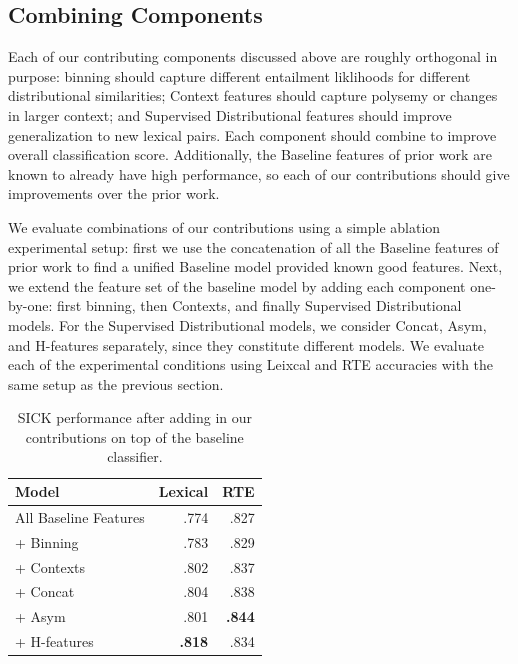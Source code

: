 \subsection{Combining Components}

Each of our contributing components discussed above are roughly orthogonal
in purpose: binning should capture different entailment liklihoods for
different distributional similarities; Context features should capture
polysemy or changes in larger context; and Supervised Distributional features
should improve generalization to new lexical pairs. Each component should
combine to improve overall classification score. Additionally, the Baseline
features of prior work are known to already have high performance, so each
of our contributions should give improvements over the prior work.

We evaluate combinations of our contributions using a simple ablation
experimental setup: first we use the concatenation of all the Baseline features
of prior work to find a unified Baseline model provided known good features.
Next, we extend the feature set of the baseline model by adding each component
one-by-one: first binning, then Contexts, and finally Supervised Distributional
models. For the Supervised Distributional models, we consider Concat, Asym,
and H-features separately, since they constitute different models. We evaluate
each of the experimental conditions using Leixcal and RTE accuracies with the
same setup as the previous section.

\begin{table}
  \centering
  \begin{tabular}{|l|rr|}
  \hline
  {\bf Model}                & {\bf Lexical} &     {\bf RTE}  \\
  \hline\hline
  All Baseline Features       &      .774     &        .827   \\
  \hline
  + Binning                   &      .783     &        .829   \\
  \quad + Contexts            &      .802     &        .837   \\
  \quad\quad + Concat         &      .804     &        .838   \\
  \quad\quad + Asym           &      .801     &    {\bf.844}  \\
  \quad\quad + H-features     &  {\bf.818}    &        .834   \\
  \hline
  \end{tabular}
  \caption{SICK performance after adding in our contributions on top of the baseline classifier.}
  \label{tab:contribrte}
\end{table}

